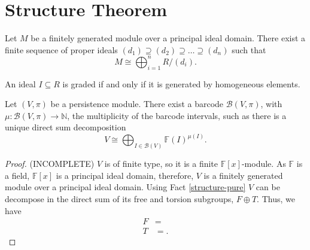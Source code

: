 \begin{definition}
    
\end{definition}

\begin{definition} \label{delta-matching}
    
\end{definition}

\begin{definition}
    
\end{definition}

\begin{definition}
    
\end{definition}

\newpage
\section{Structure Theorem}
\begin{fact} \label{structure-pure}
    Let $ M $ be a  finitely generated module over a principal ideal domain. There exist a finite sequence of proper ideals $ (d_1) \supseteq (d_2) \supseteq \dots \supseteq (d_n) $ such that
    $$
        M \cong \bigoplus_{i=1}^n R / (d_i).
    $$

\end{fact}

\begin{proposition}
    An ideal $ I \subseteq R $ is graded if and only if it is generated by homogeneous elements.
\end{proposition}

\begin{theorem}[Structure] \label{structure}
    Let $ (V, \pi) $ be a persistence module. There exist a barcode $ \mathcal B(V, \pi) $, with $ \mu : \mathcal B (V, \pi) \longrightarrow \mathbb N $, the multiplicity of the barcode intervals, such as there is a unique direct sum decomposition
    $$
        V \cong \bigoplus_{I \in  \mathcal B (V)} \mathbb F (I)^{\mu (I)}.
    $$
\end{theorem}
\begin{proof}
    (INCOMPLETE)
    $ V $ is of finite type, so it is a finite $ \mathbb F[x] $-module. As $ \mathbb F $ is a field, $ \mathbb F[x] $ is a principal ideal domain, therefore, $ V $ is a finitely generated module over a principal ideal domain. Using Fact \ref{structure-pure} $ V $ can be decompose in the direct sum of its free and torsion subgroups, $ F \oplus T $. Thus, we have
    \begin{align*}
        F &= \\
        T &= .
    \end{align*}
    
\end{proof}

